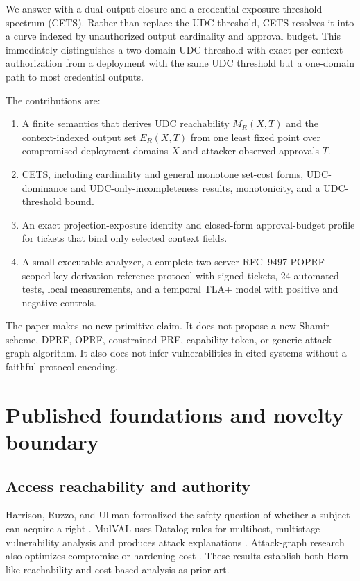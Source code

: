 \documentclass[preprint,12pt]{elsarticle}
\begin{document}
We answer with a dual-output closure and a credential exposure threshold
spectrum (CETS).  Rather than replace the UDC threshold, CETS resolves it into
a curve indexed by unauthorized output cardinality and approval budget.  This
immediately distinguishes a two-domain UDC threshold with exact per-context
authorization from a deployment with the same UDC threshold but a one-domain
path to most credential outputs.

The contributions are:

\begin{enumerate}[leftmargin=*,itemsep=3pt]
\item A finite semantics that derives UDC reachability $M_R(X,T)$ and the
  context-indexed output set $E_R(X,T)$ from one least fixed point over
  compromised deployment domains $X$ and attacker-observed approvals $T$.
\item CETS, including cardinality and general monotone set-cost forms,
  UDC-dominance and UDC-only-incompleteness results, monotonicity, and a
  UDC-threshold bound.
\item An exact projection-exposure identity and closed-form approval-budget
  profile for tickets that bind only selected context fields.
\item A small executable analyzer, a complete two-server RFC~9497 POPRF scoped
  key-derivation reference protocol with signed tickets, 24 automated tests, local
  measurements, and a temporal TLA+ model with positive and negative controls.
\end{enumerate}

The paper makes no new-primitive claim.  It does not propose a new Shamir
scheme, DPRF, OPRF, constrained PRF, capability token, or generic attack-graph
algorithm.  It also does not infer vulnerabilities in cited systems without a
faithful protocol encoding.

\section{Published foundations and novelty boundary}

\subsection{Access reachability and authority}

Harrison, Ruzzo, and Ullman formalized the safety question of whether a subject
can acquire a right \cite{hru1976}.  MulVAL uses Datalog rules for multihost,
multistage vulnerability analysis and produces attack explanations
\cite{ou2005mulval}.  Attack-graph research also optimizes compromise or
hardening cost \cite{wang2006hardening}.  These results establish both Horn-like
reachability and cost-based analysis as prior art.
\end{document}
